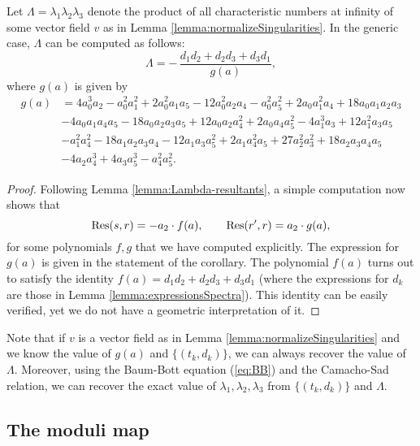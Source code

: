 \documentclass[phd,tocprelim]{cornell}
\begin{document}
\begin{corollary}\label{coro:expressionLambda}
 Let $\Lambda=\lambda_1\lambda_2\lambda_3$ denote the product of all characteristic numbers at infinity of some vector field $v$ as in Lemma \ref{lemma:normalizeSingularities}. In the generic case, $\Lambda$ can be computed as follows:
 \begin{equation}\label{eq:expressionLambda}
  \Lambda = -\,\frac{d_1d_2+d_2d_3+d_3d_1}{g(a)},
 \end{equation}
 where $g(a)$ is given by
 \begin{align*}
  g(a) &= 4a_0^3a_2-a_0^2a_1^2+2a_0^2a_1a_5-12a_0^2a_2a_4-a_0^2a_5^2+2a_0a_1^2a_4+18a_0a_1a_2a_3 \\
  & -4a_0a_1a_4a_5-18a_0a_2a_3a_5+12a_0a_2a_4^2+2a_0a_4a_5^2-4a_1^3a_3+12a_1^2a_3a_5 \\
  & -a_1^2a_4^2-18a_1a_2a_3a_4-12a_1a_3a_5^2+2a_1a_4^2a_5+27a_2^2a_3^2+18a_2a_3a_4a_5 \\
  & -4a_2a_4^3+4a_3a_5^3-a_4^2a_5^2.
 \end{align*}
\end{corollary}

\begin{proof}
Following Lemma \ref{lemma:Lambda-resultants}, a simple computation now shows that 
  \[ \operatorname{Res}(s,r)=-a_2\cdot f(a), \qquad \operatorname{Res}(r',r)=a_2\cdot g(a), \]
 for some polynomials $f,g$ that we have computed explicitly. The expression for $g(a)$ is given in the statement of the corollary. The polynomial $f(a)$ turns out to satisfy the identity $f(a)=d_1d_2+d_2d_3+d_3d_1$ (where the expressions for $d_k$ are those in Lemma \ref{lemma:expressionsSpectra}). This identity can be easily verified, yet we do not have a geometric interpretation of it.
\end{proof}

\begin{remark}\label{rmk:determineLambdas}
 Note that if $v$ is a vector field as in Lemma \ref{lemma:normalizeSingularities} and we know the value of $g(a)$ and $\{(t_k,d_k)\}$, we can always recover the value of $\Lambda$. Moreover, using the Baum-Bott equation (\ref{eq:BB}) and the Camacho-Sad relation, we can recover the exact value of $\lambda_1,\lambda_2,\lambda_3$ from $\{(t_k,d_k)\}$ and $\Lambda$.
\end{remark}


\subsection{The moduli map} 
\end{document}
